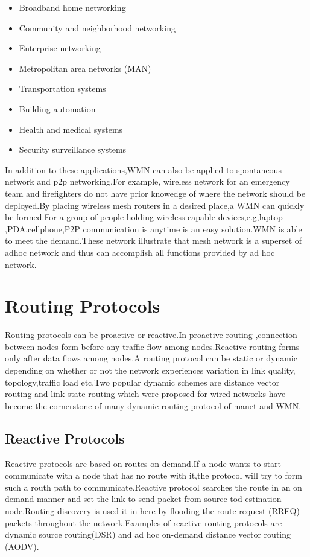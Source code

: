 \documentclass[12pt,a4paper]{report}
\begin{document}
\begin{itemize}
\item Broadband home networking
\item Community and neighborhood networking
\item Enterprise networking
\item Metropolitan area networks (MAN)
\item Transportation systems
\item Building automation
\item Health and medical systems
\item Security surveillance systems
\end{itemize}
In addition to these applications,WMN can also be applied to spontaneous network and p2p networking.For example, wireless network for an emergency team and firefighters do not have prior knowedge of where the network should be deployed.By placing wireless mesh routers in a desired place,a WMN can quickly be formed.For a group of people holding wireless capable devices,e.g,laptop ,PDA,cellphone,P2P communication is anytime is an easy solution.WMN is able to meet the demand.These network illustrate that mesh network is a superset of adhoc network and thus can accomplish all functions provided by ad hoc network.



\section{Routing Protocols}
Routing protocols can  be proactive or reactive.In proactive routing ,connection between nodes form before any traffic flow among nodes.Reactive routing forms only after data flows among nodes.A routing protocol can be static or dynamic depending on  whether or not the network experiences variation in link quality, topology,traffic load etc.Two popular dynamic schemes are distance vector routing and link state routing which were proposed for wired networks have become the cornerstone of many  dynamic routing protocol of manet and WMN.


\subsection{Reactive Protocols}
Reactive protocols are based on routes on demand.If a node wants to start communicate with a node that has no route with it,the protocol will try to form such a routh path to communicate.Reactive protocol searches the route in an on demand manner and set the link to send packet from source tod estination node.Routing discovery is used it in here by flooding the route request (RREQ) packets throughout the network.Examples of reactive routing protocols are dynamic source routing(DSR) and ad hoc on-demand distance vector routing (AODV).
\end{document}
